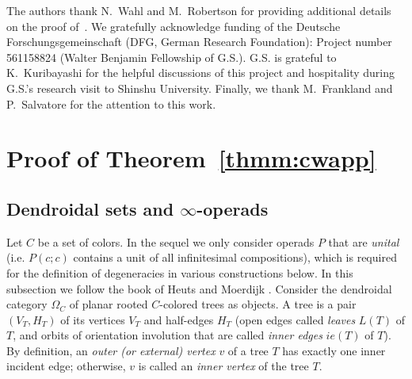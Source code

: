 \documentclass{amsart}
\theoremstyle{definition}
\theoremstyle{remark}
\begin{document}
	
	The authors thank N.~Wahl and M.~Robertson for providing additional details on the proof of~\cite[Theorem B.6]{clrrw-22}. 
	We gratefully acknowledge funding of the Deutsche Forschungsgemeinschaft
	(DFG, German Research Foundation): Project number 561158824 (Walter Benjamin Fellowship of G.S.).
    G.S. is grateful to K.~Kuribayashi for the helpful discussions of this project and hospitality during G.S.'s research visit to Shinshu University.
    Finally, we thank M.~Frankland and P.~Salvatore for the attention to this work.
	
	\section{Proof of Theorem~\ref{thmm:cwapp}}\label{sec:thm1}

	\subsection{Dendroidal sets and $\infty$-operads}\label{ssec:dset}

    Let $C$ be a set of colors.	
	In the sequel we only consider operads $P$ that are \textit{unital} (i.e. $P(c;c)$ contains a unit of all infinitesimal compositions), which is required for the definition of degeneracies in various constructions below.
	In this subsection we follow the book of Heuts and Moerdijk \cite{he-mo-22}.
	Consider the dendroidal category $\Omega_{C}$ of planar rooted $C$-colored trees as objects.
	A tree is a pair $(V_T, H_T)$ of its vertices $V_T$ and half-edges $H_T$ (open edges called \emph{leaves} $L(T)$ of $T$, and orbits of orientation involution that are called \emph{inner edges} $ie(T)$ of $T$).
	By definition, an \textit{outer (or external) vertex} $v$ of a tree $T$ has exactly one inner incident edge; otherwise, $v$ is called an \textit{inner vertex} of the tree $T$.
	
\end{document}
